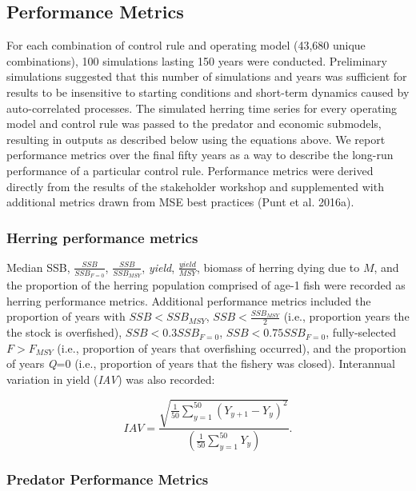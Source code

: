 \documentclass[]{article}
\begin{document}
\subsection{Performance Metrics}\label{performance-metrics}

For each combination of control rule and operating model (43,680 unique
combinations), 100 simulations lasting 150 years were conducted.
Preliminary simulations suggested that this number of simulations and
years was sufficient for results to be insensitive to starting
conditions and short-term dynamics caused by auto-correlated processes.
The simulated herring time series for every operating model and control
rule was passed to the predator and economic submodels, resulting in
outputs as described below using the equations above. We report
performance metrics over the final fifty years as a way to describe the
long-run performance of a particular control rule. Performance metrics
were derived directly from the results of the stakeholder workshop and
supplemented with additional metrics drawn from MSE best practices (Punt
et al. 2016a).

\subsubsection{Herring performance
metrics}\label{herring-performance-metrics}

Median SSB, \(\frac{SSB}{SSB_{F=0}}\), \(\frac{SSB}{SSB_{MSY}}\),
\emph{yield}, \(\frac{yield}{MSY}\), biomass of herring dying due to
\(M\), and the proportion of the herring population comprised of age-1
fish were recorded as herring performance metrics. Additional
performance metrics included the proportion of years with
\(SSB < SSB_{MSY}\), \(SSB < \frac{SSB_{MSY}}{2}\) (i.e., proportion
years the the stock is overfished), \(SSB < 0.3SSB_{F=0}\),
\(SSB < 0.75SSB_{F=0}\), fully-selected \(F > F_{MSY}\) (i.e.,
proportion of years that overfishing occurred), and the proportion of
years \emph{Q}=0 (i.e., proportion of years that the fishery was
closed). Interannual variation in yield (\emph{IAV}) was also recorded:

\begin{equation}
IAV=\frac{\sqrt{\frac{1}{50}\sum\limits_{y=1}^{50}(Y_{y+1}-Y_{y})^2}}{(\frac{1}{50}\sum\limits_{y=1}^{50}Y_y)}.
\end{equation}

\subsubsection{Predator Performance
Metrics}\label{predator-performance-metrics}
\end{document}

